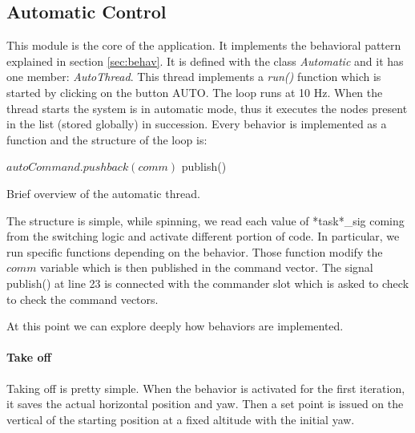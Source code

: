 \subsection{Automatic Control}
\label{sec:auto}
This module is the core of the application. It implements the behavioral pattern explained in section \ref{sec:behav}. It is defined with the class \textit{Automatic} and it has one member: \textit{AutoThread}. This thread implements a \textit{run()} function which is started by clicking on the button AUTO. The loop runs at 10 Hz. When the thread starts the system is in automatic mode, thus it executes the nodes present in the list (stored globally) in succession. Every behavior is implemented as a function and the structure of the loop is:
\begin{algorithm}
\begin{algorithmic} [1]
 
\ENDIF
{}			  
\ENDIF
{}			  
\ENDIF
{}		  
\ENDIF
{}			  
\ENDIF
{}			  
\ENDIF
\STATE $autoCommand.pushback(comm)$ 
\STATE publish()
\ENDWHILE
\end{algorithmic}
\label{alg:autothread}
\caption{Brief overview of the automatic thread.}
\end{algorithm}
The structure is simple, while spinning, we read each value of *task*\_sig coming from the switching logic and activate different portion of code. In particular, we run specific functions depending on the behavior. Those function modify the $comm$ variable which is then published in the command vector. The signal publish() at line 23 is connected with the commander slot which is asked to check to check the command vectors. 

At this point we can explore deeply how behaviors are implemented.

\paragraph{Take off} Taking off is pretty simple. When the behavior is activated for the first iteration, it saves the actual horizontal position and yaw. Then a set point is issued on the vertical of the starting position at a fixed altitude with the initial yaw. 

